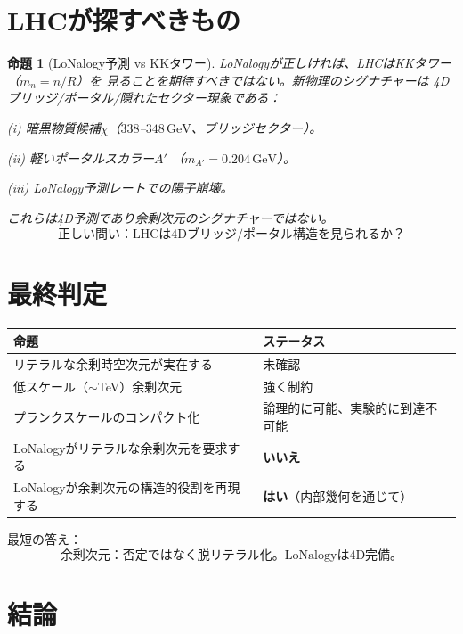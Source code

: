 \documentclass[12pt]{article}
\theoremstyle{plain}
\newtheorem{proposition}[theorem]{命題}
\theoremstyle{definition}
\numberwithin{equation}{section}
\begin{document}
\section{LHCが探すべきもの}\label{sec:lhc}

\begin{proposition}[LoNalogy予測 vs KKタワー]\label{prop:lhc}
LoNalogyが正しければ、LHCはKKタワー（$m_n=n/R$）を
見ることを期待すべきではない。新物理のシグナチャーは
4Dブリッジ/ポータル/隠れたセクター現象である：

(i) 暗黒物質候補$\chi$（$338$--$348\,\mathrm{GeV}$、ブリッジセクター）。

(ii) 軽いポータルスカラー$A'$
（$m_{A'}=0.204\,\mathrm{GeV}$）。

(iii) LoNalogy予測レートでの陽子崩壊。

これらは4D予測であり余剰次元のシグナチャーではない。
\begin{equation}
\boxed{\text{正しい問い：LHCは4Dブリッジ/ポータル構造を見られるか？}}
\end{equation}
\end{proposition}


\section{最終判定}\label{sec:verdict}

\begin{center}
\begin{tabular}{p{5.5cm}l}
\toprule
命題 & ステータス\\
\midrule
リテラルな余剰時空次元が実在する & 未確認\\
低スケール（$\sim$TeV）余剰次元 & 強く制約\\
プランクスケールのコンパクト化 & 論理的に可能、実験的に到達不可能\\
LoNalogyがリテラルな余剰次元を要求する & \textbf{いいえ}\\
LoNalogyが余剰次元の構造的役割を再現する & \textbf{はい}（内部幾何を通じて）\\
\bottomrule
\end{tabular}
\end{center}

最短の答え：
\begin{equation}
\boxed{\text{余剰次元：否定ではなく脱リテラル化。LoNalogyは4D完備。}}
\end{equation}


\section*{結論}
\end{document}

